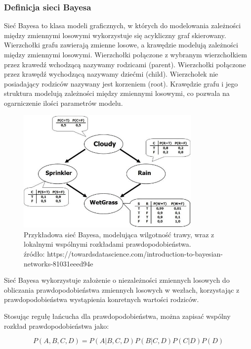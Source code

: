 \documentclass{article}
\begin{document}
\subsubsection{Definicja sieci Bayesa}
Sieć Bayesa to klasa modeli graficznych, w których do modelowania zależności między zmiennymi losowymi wykorzystuje się acykliczny graf skierowany. Wierzchołki grafu zawierają zmienne losowe, a krawędzie modelują zależności między zmiennymi losowymi. Wierzchołki połączone z wybranym wierzchołkiem przez krawedź wchodzącą nazywamy rodzicami (parent). Wierzchołki połączone przez krawędź wychodzącą nazywamy dziećmi (child). Wierzchołek nie posiadający rodziców nazywany jest korzeniem (root). Krawędzie grafu i jego struktura modelują zależności między zmiennymi losowymi, co pozwala na ogarniczenie ilości parametrów modelu.

\begin{figure}
\centering
	\includegraphics[width=0.80\textwidth]{net.jpeg}\par\vspace{1cm}
\caption{Przykładowa sieć Bayesa, modelująca wilgotność trawy, wraz z lokalnymi wspólnymi rozkładami prawdopodobieństwa. \\ źródło: https://towardsdatascience.com/introduction-to-bayesian-networks-81031eeed94e}
	\label{fig:net}
\end{figure}

Sieć Bayesa wykorzystuje założenie o niezależności zmiennych losowych do obliczania prawdopodobieństwa zmiennych losowych w wezłach, korzystając z prawdopodobieństwa wystąpienia konretnych wartości rodziców. 

Stosując regułę łańcucha dla prawdopodobieństwa, można zapisać wspólny rozkład prawdopodobieństwa jako:

\begin{equation}
	P(A, B, C, D) = P(A|B, C, D)P(B|C, D)P(C|D)P(D)
\end{equation}
\end{document}
